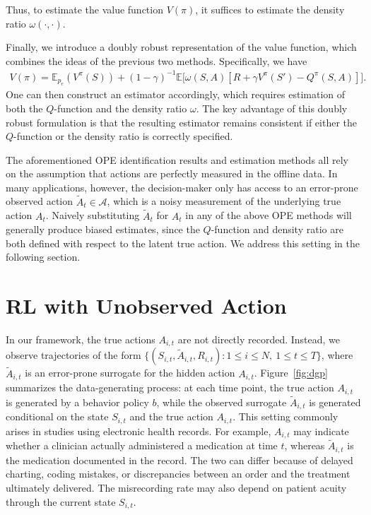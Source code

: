 \documentclass[12pt]{article}
\newcommand{\0}{\boldsymbol{0}}
\newcommand{\E}{\mathbb{E}}
\newcommand{\ZB}[1]{{\color{cyan}{ #1}}}
\begin{document}
Thus, to estimate the value function $V(\pi)$, it suffices to estimate the density ratio $\omega(\cdot,\cdot)$.

Finally, we introduce a doubly robust representation \citep{kallus2022efficiently} of the value function, which combines the ideas of the previous two methods. Specifically, we have 
    \begin{align*}
       V(\pi)= \E_{p_e} (V^\pi(S))+(1-\gamma)^{-1} \E \Big[\omega(S,A)\left[ R+ \gamma V^\pi(S')-Q^\pi(S,A)\right] \Big].
    \end{align*} One can then construct an estimator accordingly, which requires estimation of both the $Q$-function and the density ratio $\omega$. The key advantage of this doubly robust formulation is that the resulting estimator remains consistent if either the $Q$-function or the density ratio is correctly specified.



The aforementioned OPE identification results and estimation methods all rely on the assumption that actions are perfectly measured in the offline data. In many applications, however,  the decision-maker only has access to an error-prone observed action $\widetilde A_t \in \mathcal{A}$, which is a noisy measurement of the underlying true action $A_t$. Naively substituting $\widetilde A_t$ for $A_t$ in any of the above OPE methods will generally produce biased estimates, since the $Q$-function and density ratio are both defined with respect to the latent true action. We address this setting in the following section.


\section{RL with Unobserved Action} \label{sec: latent_action}

In our framework, the true actions $A_{i,t}$ are not directly recorded. Instead, we observe trajectories of the form $\{(S_{i,t},\widetilde A_{i,t},R_{i,t}) : 1\le i\le N,\ 1\le t\le T\}$, where $\widetilde A_{i,t}$ is an error-prone surrogate for the hidden action $A_{i,t}$. Figure~\ref{fig:dgp} summarizes the data-generating process: at each time point, the true action $A_{i,t}$ is generated by a behavior policy $b$, while the observed surrogate $\widetilde A_{i,t}$ is generated conditional on the state $S_{i,t}$ and the true action $A_{i,t}$. This setting commonly arises in studies using electronic health records. For example, $A_{i,t}$ may indicate whether a clinician actually administered a medication at time $t$, whereas $\widetilde A_{i,t}$ is the medication documented in the record. The two can differ because of delayed charting, coding mistakes, or discrepancies between an order and the treatment ultimately delivered. The misrecording rate may also depend on patient acuity through the current state $S_{i,t}$.
\end{document}
